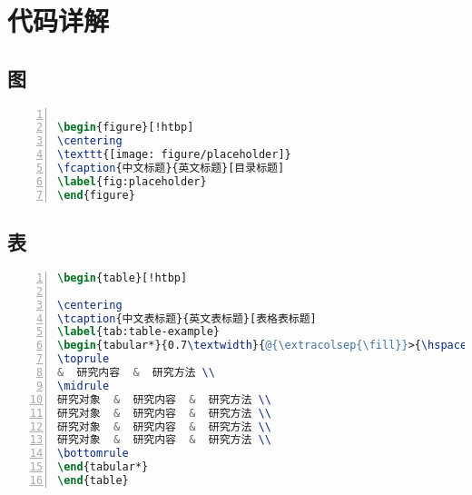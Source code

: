 
\chapter{ 代码详解}

\section{图}
\begin{lstlisting}[language=tex, label=lst:helloworld, caption=图-题注代码, numbers=left, basicstyle=\ttfamily]

\begin{figure}[!htbp]
\centering
\texttt{[image: figure/placeholder]}
\fcaption{中文标题}{英文标题}[目录标题]
\label{fig:placeholder}
\end{figure}

\end{lstlisting}

\section{表}

\begin{lstlisting}[language=tex, label=lst:helloworld, caption=表-题注代码, numbers=left, basicstyle=\ttfamily]
\begin{table}[!htbp]

\centering
\tcaption{中文表标题}{英文表标题}[表格表标题]
\label{tab:table-example}
\begin{tabular*}{0.7\textwidth}{@{\extracolsep{\fill}}>{\hspace{0.5cm}}ccc}
\toprule
&  研究内容  &  研究方法 \\
\midrule
研究对象  &  研究内容  &  研究方法 \\
研究对象  &  研究内容  &  研究方法 \\
研究对象  &  研究内容  &  研究方法 \\
研究对象  &  研究内容  &  研究方法 \\
\bottomrule
\end{tabular*} 
\end{table}
\end{lstlisting}


